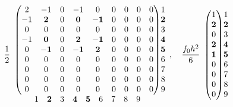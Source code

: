 \[\frac12\begin{array}{c@{}c}
\begin{pmatrix}
2&-1&0&-1&0&0&0&0&0\\
-1&\mathbf2&0&\mathbf0&\mathbf{-1}&0&0&0&0\\
0&0&0&0&0&0&0&0&0\\
-1&\mathbf0&0&\mathbf2&\mathbf{-1}&0&0&0&0\\
0&\mathbf{-1}&0&\mathbf{-1}&\mathbf2&0&0&0&0\\
0&0&0&0&0&0&0&0&0\\0&0&0&0&0&0&0&0&0\\0&0&0&0&0&0&0&0&0\\0&0&0&0&0&0&0&0&0
\end{pmatrix}&\begin{matrix}1\\\mathbf2\\3\\\mathbf4\\\mathbf5\\6\\7\\8\\9\end{matrix}\\
\begin{matrix}1&\mathbf2&3&\mathbf4&\mathbf5&6&7&8&9\end{matrix}&
\end{array},\quad\frac{f_0h^2}{6}\begin{array}{c@{}c}
\begin{pmatrix}1\\\mathbf2\\0\\\mathbf2\\\mathbf1\\0\\0\\0\\0\end{pmatrix}&\begin{matrix}1\\\mathbf2\\3\\\mathbf4\\\mathbf5\\6\\7\\8\\9\end{matrix}
\end{array}\]
